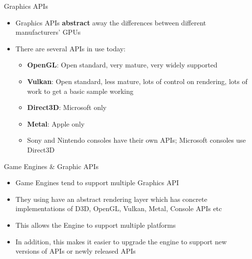 \begin{frame}{Graphics APIs}
	\begin{itemize}
		\item Graphics APIs \textbf{abstract} away the differences between different manufacturers' GPUs
		\pause\item There are several APIs in use today:
		\begin{itemize}
			\pause\item \textbf{OpenGL}: Open standard, very mature, very widely supported
			\pause\item \textbf{Vulkan}: Open standard, less mature, lots of control on rendering, lots of work to get a basic sample working
			\pause\item \textbf{Direct3D}: Microsoft only
			\pause\item \textbf{Metal}: Apple only
			\pause\item Sony and Nintendo consoles have their own APIs; Microsoft consoles use Direct3D
		\end{itemize}
	\end{itemize}
\end{frame}

\begin{frame}{Game Engines \& Graphic APIs}
\begin{itemize}
	\item Game Engines tend to support multiple Graphics API
	\pause \item They using have an abstract rendering layer which has concrete implementations of D3D, OpenGL, Vulkan, Metal, Console APIs etc
	\pause \item This allows the Engine to support multiple platforms
	\pause \item In addition, this makes it easier to upgrade the engine to support new versions of APIs or newly released APIs
\end{itemize}
\end{frame}
